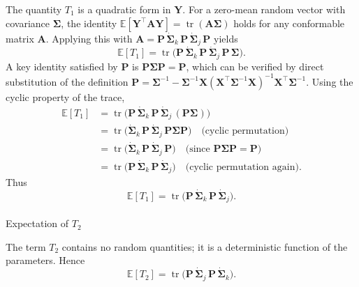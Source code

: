 \documentclass[
  letterpaper,
  DIV=11,
  numbers=noendperiod]{scrartcl}
\makeatletter
\let\oldparagraph\paragraph
\renewcommand{\paragraph}{
    \@ifstar
      \xxxParagraphStar
      \xxxParagraphNoStar
  }
\newcommand{\xxxParagraphStar}[1]{\oldparagraph*{#1}\mbox{}}
\newcommand{\xxxParagraphNoStar}[1]{\oldparagraph{#1}\mbox{}}
\makeatother
\begin{document}
The quantity \(T_1\) is a quadratic form in \(\symbf{Y}\). For a
zero-mean random vector with covariance \(\symbf{\Sigma}\), the identity
\(\mathbb{E}[\symbf{Y}^\top \symbf{A} \symbf{Y}] = \operatorname{tr}(\symbf{A} \symbf{\Sigma})\)
holds for any conformable matrix \(\symbf{A}\). Applying this with
\(\symbf{A} = \symbf{P}\,\dot{\symbf{\Sigma}}_k\,\symbf{P}\,\dot{\symbf{\Sigma}}_j\,\symbf{P}\)
yields \begin{equation}
\mathbb{E}[T_1] = \operatorname{tr}\!\big( \symbf{P}\,\dot{\symbf{\Sigma}}_k\,\symbf{P}\,\dot{\symbf{\Sigma}}_j\,\symbf{P} \, \symbf{\Sigma} \big).
\end{equation} A key identity satisfied by \(\symbf{P}\) is
\(\symbf{P}\symbf{\Sigma}\symbf{P} = \symbf{P}\), which can be verified
by direct substitution of the definition
\(\symbf{P} = \symbf{\Sigma}^{-1} - \symbf{\Sigma}^{-1}\symbf{X}(\symbf{X}^\top\symbf{\Sigma}^{-1}\symbf{X})^{-1}\symbf{X}^\top\symbf{\Sigma}^{-1}\).
Using the cyclic property of the trace, \begin{align}
\mathbb{E}[T_1] &= \operatorname{tr}\!\big( \symbf{P}\,\dot{\symbf{\Sigma}}_k\,\symbf{P}\,\dot{\symbf{\Sigma}}_j\, (\symbf{P}\symbf{\Sigma}) \big) \\
&= \operatorname{tr}\!\big( \dot{\symbf{\Sigma}}_k\,\symbf{P}\,\dot{\symbf{\Sigma}}_j\,\symbf{P}\symbf{\Sigma}\symbf{P} \big) \quad \text{(cyclic permutation)} \\
&= \operatorname{tr}\!\big( \dot{\symbf{\Sigma}}_k\,\symbf{P}\,\dot{\symbf{\Sigma}}_j\,\symbf{P} \big) \quad \text{(since $\symbf{P}\symbf{\Sigma}\symbf{P} = \symbf{P}$)} \\
&= \operatorname{tr}\!\big( \symbf{P}\,\dot{\symbf{\Sigma}}_k\,\symbf{P}\,\dot{\symbf{\Sigma}}_j \big) \quad \text{(cyclic permutation again)}.
\end{align} Thus \begin{equation}
\mathbb{E}[T_1] = \operatorname{tr}\!\big( \symbf{P}\,\dot{\symbf{\Sigma}}_k\,\symbf{P}\,\dot{\symbf{\Sigma}}_j \big).
\end{equation}

\paragraph{\texorpdfstring{Expectation of
\(T_2\)}{Expectation of T\_2}}\label{expectation-of-t_2}

The term \(T_2\) contains no random quantities; it is a deterministic
function of the parameters. Hence \begin{equation}
\mathbb{E}[T_2] = \operatorname{tr}\!\big( \symbf{P}\,\dot{\symbf{\Sigma}}_j\,\symbf{P}\,\dot{\symbf{\Sigma}}_k \big).
\end{equation}
\end{document}
